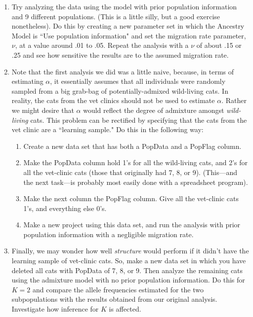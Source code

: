 \begin{enumerate}
\item Try analyzing the data using the model with prior population information and 9 different populations.  (This is a little silly, but a good exercise nonetheless).  Do this by creating a new parameter set in which the Ancestry Model is ``Use population information" and set the migration rate parameter, $\nu$, at a value around .01 to .05.  Repeat the analysis with a $\nu$ of about .15 or .25 and see how sensitive the results are to the assumed migration rate. 
\item Note that the first analysis we did was a little naive, because, in terms of estimating $\alpha$, it essentially assumes that all individuals were randomly sampled from a big grab-bag of potentially-admixed wild-living cats.  In reality, the cats from the vet clinics should not be used to estimate $\alpha$.  Rather we might desire that $\alpha$ would reflect the degree of admixture amongst {\em wild-living} cats.  This problem can be rectified by specifying that the cats from the vet clinic are a ``learning sample."  Do this in the following way:
\begin{enumerate}
\item Create a new data set that has both a PopData and a PopFlag column.  
\item Make the PopData column hold 1's for all the wild-living cats, and 2's for all the vet-clinic cats (those that originally had 7, 8, or 9).  (This---and the next task---is probably most easily done with a spreadsheet program).  
\item Make the next column the PopFlag column.  Give all the vet-clinic cats 1's, and everything else 0's. 
\item Make a new project using this data set, and run the analysis with prior population information with a negligible migration rate.  

\end{enumerate}
\item Finally, we may wonder how well {\em structure} would perform if it didn't have the learning sample of vet-clinic cats.  So, make a new data set in which you have deleted all cats with PopData of 7, 8, or 9.  Then analyze the remaining cats using the admixture model with no prior population information.  Do this for $K=2$ and compare the allele frequencies estimated for the two subpopulations with the results obtained from our original analysis.  Investigate how inference for $K$ is affected.  
\end{enumerate}


%
%
%


 